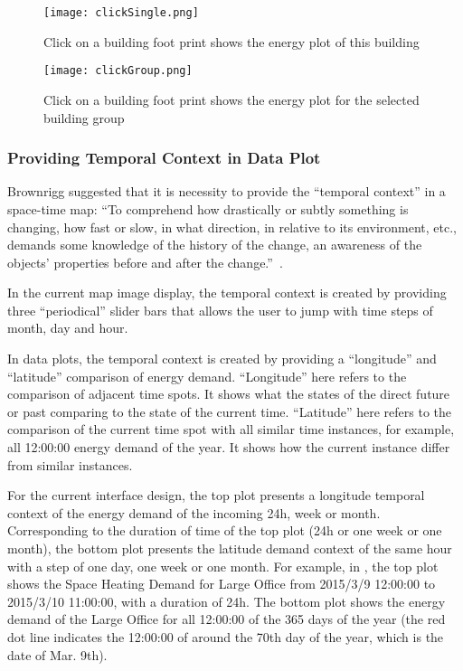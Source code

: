 \begin{enumerate}[1)]
  \begin{figure}[h!]
    \centering
    \texttt{[image: clickSingle.png]}
    \caption[Show Plot for One Building]{Click on a building foot
      print shows the energy plot of this building}
    \label{fig:clickSingle}
  \end{figure}

  \begin{figure}[h!]
    \centering
    \texttt{[image: clickGroup.png]}
    \caption[Show Plot for a Group of Buildings]{Click on a building
      foot print shows the energy plot for the selected building group}
    \label{fig:clickGroup}
  \end{figure}

\end{enumerate}

\subsubsection{Providing Temporal Context in Data Plot}

Brownrigg suggested that it is necessity to provide the ``temporal
context'' in a space-time map: ``To comprehend how drastically or
subtly something is changing, how fast or slow, in what direction, in
relative to its environment, etc., demands some knowledge of the
history of the change, an awareness of the objects' properties before
and after the change.''~\cite{Brownrigg2005}.

In the current map image display, the temporal context is created by
providing three ``periodical'' slider bars that allows the user to
jump with time steps of month, day and hour. 

In data plots, the temporal context is created by providing a
``longitude'' and ``latitude'' comparison of energy demand.
``Longitude'' here refers to the comparison of adjacent time spots. It
shows what the states of the direct future or past comparing to the
state of the current time. ``Latitude'' here refers to the comparison
of the current time spot with all similar time instances, for example,
all 12:00:00 energy demand of the year. It shows how the current
instance differ from similar instances.

For the current interface design, the top plot presents a longitude
temporal context of the energy demand of the incoming 24h, week or
month. Corresponding to the duration of time of the top plot (24h or
one week or one month), the bottom plot presents the latitude demand
context of the same hour with a step of one day, one week or one
month. For example, in , the top plot shows the
Space Heating Demand for Large Office from 2015/3/9 12:00:00 to
2015/3/10 11:00:00, with a duration of 24h. The bottom plot shows the
energy demand of the Large Office for all 12:00:00 of the 365 days of
the year (the red dot line indicates the 12:00:00 of around the 70th
day of the year, which is the date of Mar. 9th).

